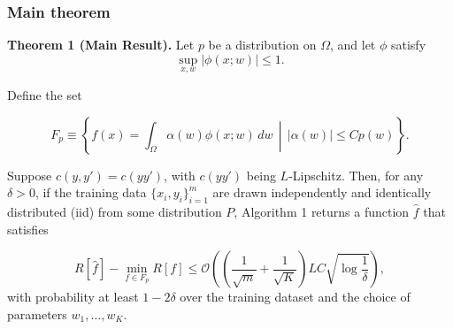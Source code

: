 \begin{frame}
  \frametitle{Main theorem}

  \textbf{Theorem 1 (Main Result).} Let $p$ be a distribution on $\Omega$, and let $\phi$ satisfy 
  \begin{equation}
    \sup_{x,w} |\phi(x; w)| \leq 1.
  \end{equation}

   Define the set

\begin{equation}
  F_p 
  \equiv 
  \left\{ 
    f(x) = \int_\Omega \alpha(w)\phi(x; w) \, dw \, 
    \middle| 
    \, |\alpha(w)| \leq C p(w) \right\}. 
\end{equation}

Suppose $c(y, y') = c(yy')$, with $c(yy')$ being $L$-Lipschitz. Then, for any $\delta > 0$, if the training data $\{x_i, y_i\}_{i=1}^m$ are drawn independently and identically distributed (iid) from some distribution $P$, Algorithm 1 returns a function $\hat{f}$ that satisfies

\begin{equation}
  R[\hat{f}] - \min_{f \in F_p} R[f] 
  \leq 
  \mathcal{O}\left(\left(\frac{1}{\sqrt{m}} + \frac{1}{\sqrt{K}}\right)
  LC\sqrt{\log\frac{1}{\delta}}\right), 
\end{equation}
with probability at least $1 - 2\delta$ over the training dataset and the choice of parameters $w_1, \ldots, w_K$.


\end{frame}